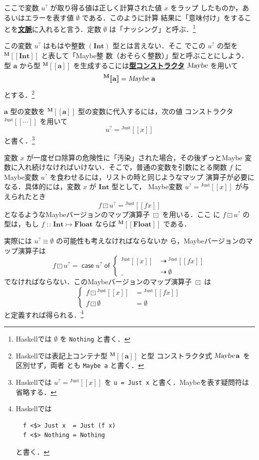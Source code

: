 \documentclass[a5paper,twoside,fleqn,draft]{jsbook}
\def\[{[\![}
\def\]{]\!]}
\newcommand{\programminglanguage}[1]{\textsf{#1}}
\newcommand{\haskell}{\programminglanguage{Haskell}}
\newcommand{\keyword}[1]{{\underline{\textbf{#1}}}}
\newcommand{\code}[1]{\texttt{#1}}
\newcommand{\mKeyword}[1]{\mathsf{#1}}
\newcommand{\mCaseKeyword}{\mKeyword{case}}
\newcommand{\mOfKeyword}{\mKeyword{of}}
\DeclareMathOperator{\mCaseKW}{\mCaseKeyword}
\DeclareMathOperator{\mOfKW}{\mOfKeyword}
\newcommand{\mNothing}{\emptyset}
\DeclareMathOperator{\mFuncArrow}{\mapsto}
\DeclareMathOperator{\mIfSo}{\dashrightarrow}
\DeclareMathOperator{\mIn}{{:\!:}}
\DeclareMathOperator{\mMapMaybe}{\boxdot}
\newcommand{\mType}[1]{\mathbf{#1}} %
\newcommand{\mA}{\mType{a}}
\newcommand{\mFloatType}{\mType{Float}}
\newcommand{\mIntType}{\mType{Int}}
\newcommand{\mTypeAssemble}[2]{{}^\mType{#1}\[\mType{#2}\]}
\newcommand{\mMaybeType}[1]{\mTypeAssemble{M}{#1}}
\newcommand{\mTypeConstructor}[1]{\textsl{#1}}
\DeclareMathOperator{\mMaybeTypeConstructor}{\mTypeConstructor{Maybe}}
\newcommand{\mValueConstructor}[1]{\mathrm{#1}}
\newcommand{\mValueWith}[2]{{}^\mValueConstructor{#1}\[#2\]}
\newcommand{\mJustWith}[1]{\mValueWith{Just}{#1}}
\newcommand{\mMaybe}[1]{{#1}^?}
\newcommand{\mCaseOf}[1]{\mCaseKW#1\mOfKW}
\newcommand{\mProjEXP}[2]{#1\mFuncArrow#2} %
\begin{document}
ここで変数 $\mMaybe{u}$ が取り得る値は正しく計算された値 $x$ をラップ
したものか，あるいはエラーを表す値 $\mNothing$ である．このように計算
結果に「意味付け」をすることを\keyword{文脈}に入れると言う．定数
$\mNothing$ は「ナッシング」と呼ぶ．\footnote{\haskell では
  $\mNothing$ を \code{Nothing} と書く．}

この変数 $\mMaybe{u}$ はもはや整数 $(\mIntType)$ 型とは言えない．そこ
でこの $\mMaybe{u}$ の型を $\mMaybeType{\mIntType}$ と表して「Maybe整
  数（おそらく整数）」型と呼ぶことにしよう．型 $\mA $ から型
$\mMaybeType{a}$ を生成するこには\keyword{型コンストラクタ}
$\mMaybeTypeConstructor$ を用いて
\begin{equation}
  \mMaybeType{a}
  =\mMaybeTypeConstructor\,\mA
\end{equation}
とする．\footnote{\haskell では表記上コンテナ型 $\mMaybeType{a}$ と型
  コンストラクタ式 $\mMaybeTypeConstructor\mA$ を区別せず，両者
  とも \code{Maybe a} と書く．}

$\mA $ 型の変数を $\mMaybeType{a}$ 型の変数に代入するには，次の値
コンストラクタ $\mJustWith{\dotsb}$ を用いて
\begin{equation}
  \mMaybe{u}
  =\mJustWith{x}
\end{equation}
と書く．\footnote{\haskell では $\mMaybe{u}=\mJustWith{x}$ を \code{u
    = Just x} と書く．Maybeを表す疑問符は省略する．}

変数 $x$ が一度ゼロ除算の危険性に「汚染」された場合，その後ずっとMaybe
変数に入れ続けなければいけない．そこで，普通の変数を引数にとる関数 $f$
にMaybe変数 $\mMaybe{u}$ を食わせるには，リストの時と同じようなマップ
演算子が必要になる．具体的には，変数 $x$ が $\mType{Int}$ 型として，
Maybe変数 $\mMaybe{u}=\mJustWith{x}$ が与えられたとき
\begin{equation}
  f\mMapMaybe\mMaybe{u}
  =\mJustWith{fx}
\end{equation}
となるようなMaybeバージョンのマップ演算子 $\mMapMaybe$ を用いる．ここ
に $f\mMapMaybe\mMaybe{u}$ の型は，もし
$f\mIn\mProjEXP{\mIntType}{\mFloatType}$ ならば
$\mMaybeType{\mFloatType}$ である．

実際には $\mMaybe{u}\equiv\mNothing$ の可能性も考えなければならないか
ら，Maybeバージョンのマップ演算子は
\begin{equation}
  f\mMapMaybe\mMaybe{u}
  =\mCaseOf{\mMaybe{u}}
  \begin{cases}
    \mJustWith{x}
    &\mIfSo\mJustWith{fx}\\
    \_
    &\mIfSo\mNothing
  \end{cases}
\end{equation}
でなければならない．このMaybeバージョンのマップ演算子 $\mMapMaybe$ は
\begin{equation}
  \left\{
  \begin{aligned}
    f\mMapMaybe\mJustWith{x}
    &=\mJustWith{fx}\\
    f\mMapMaybe\mNothing
    &=\mNothing
  \end{aligned}
  \right.
\end{equation}
と定義すれば得られる．\footnote{\haskell では
\begin{verbatim}
  f <$> Just x  = Just (f x)
  f <$> Nothing = Nothing
\end{verbatim}
と書く．}
\end{document}
